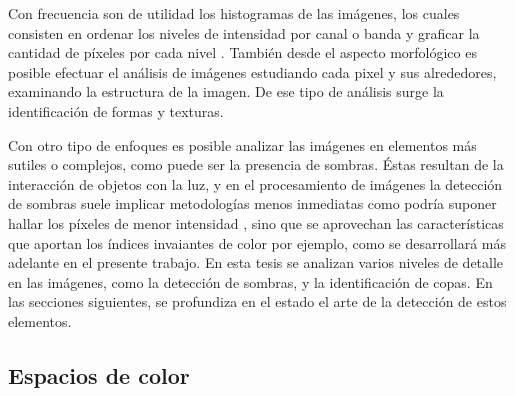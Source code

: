 Con frecuencia son de utilidad los histogramas de las imágenes, los cuales consisten en ordenar los niveles de intensidad por canal o banda y graficar la cantidad de píxeles por cada nivel \cite{atienza_histograma_nodate}. También desde el aspecto morfológico es posible efectuar el análisis de imágenes estudiando cada pixel y sus alrededores, examinando la estructura de la imagen. De ese tipo de análisis surge la identificación de formas y texturas.

Con otro tipo de enfoques es posible analizar las imágenes en elementos más sutiles o complejos, como puede ser la presencia de sombras. Éstas resultan de la interacción de objetos con la luz, y en el procesamiento de imágenes la detección de sombras suele implicar metodologías menos inmediatas como podría suponer hallar los píxeles de menor intensidad \cite{sanin_shadow_2012}, sino que se aprovechan las características que aportan los índices invaiantes de color por ejemplo, como se desarrollará más adelante en el presente trabajo. 
En esta tesis se analizan varios niveles de detalle en las imágenes, como la detección de sombras, y la identificación de copas.
En las secciones siguientes, se profundiza en el estado el arte de la detección de estos elementos.
\subsection{Espacios de color} \label{espacio_color}


